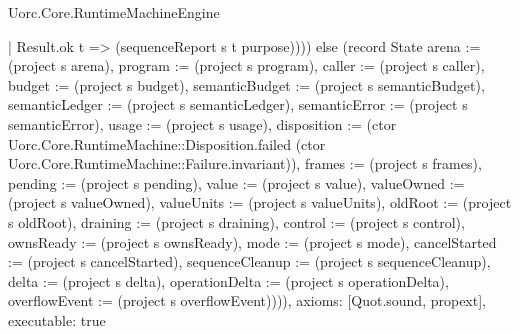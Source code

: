 \begin{lexlean}{Uorc.Core.RuntimeMachineEngine}
\begin{semanticmodule}
{      | Result.ok t => (sequenceReport s t purpose)))) else (record State {arena := (project s arena), program := (project s program), caller := (project s caller), budget := (project s budget), semanticBudget := (project s semanticBudget), semanticLedger := (project s semanticLedger), semanticError := (project s semanticError), usage := (project s usage), disposition := (ctor Uorc.Core.RuntimeMachine::Disposition.failed (ctor Uorc.Core.RuntimeMachine::Failure.invariant)), frames := (project s frames), pending := (project s pending), value := (project s value), valueOwned := (project s valueOwned), valueUnits := (project s valueUnits), oldRoot := (project s oldRoot), draining := (project s draining), control := (project s control), ownsReady := (project s ownsReady), mode := (project s mode), cancelStarted := (project s cancelStarted), sequenceCleanup := (project s sequenceCleanup), delta := (project s delta), operationDelta := (project s operationDelta), overflowEvent := (project s overflowEvent)}))),
  axioms: [Quot.sound, propext],
  executable: true
}


\end{semanticmodule}
\end{lexlean}
